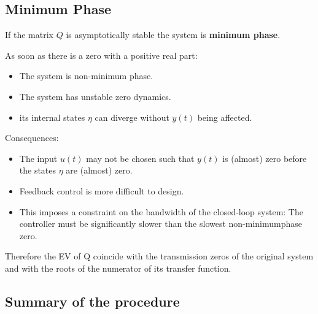 \documentclass[10pt,a4paper]{scrartcl}
\begin{document}
\begin{multicols*}{3}
\null

\columnbreak

\subsection{Minimum Phase}

If the matrix $Q$ is asymptotically stable the system is \textbf{minimum phase}.

As soon as there is a zero with a positive real part:

\begin{itemize}
\ncompaq
\item The system is non-minimum phase.
\item The system has unstable zero dynamics.
\item its internal states $\eta$ can diverge without $y(t)$ being affected.
\end{itemize}

Consequences:

\begin{itemize}
\ncompaq
\item The input $u(t)$ may not be chosen such that $y(t)$ is (almost) zero before the states $\eta$ are (almost) zero.
\item Feedback control is more difficult to design.
\item This imposes a constraint on the bandwidth of the closed-loop system: The controller must be significantly slower than the slowest non-minimumphase zero.
\end{itemize}


Therefore the EV of Q coincide with the transmission zeros of the original system and with the roots of the numerator of its transfer function.


\vfill

\null

\columnbreak

\subsection{Summary of the procedure}


\end{multicols*}
\end{document}
